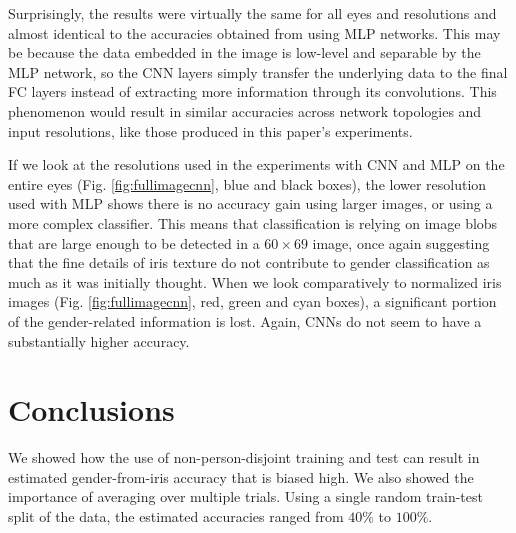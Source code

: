\documentclass[10pt,twocolumn,letterpaper]{article}
\begin{document}
Surprisingly, the results were virtually the same for all eyes and resolutions and almost identical to the accuracies obtained from using MLP networks. 
This may be because the data embedded in the image is low-level and separable by the MLP network, so the CNN layers simply transfer the underlying data to the final FC layers instead of extracting more information through its convolutions. 
This phenomenon would result in similar accuracies across network topologies and input resolutions, like those produced in this paper's experiments.

If we look at the resolutions used in the experiments with CNN and MLP on the entire eyes (Fig. \ref{fig:fullimagecnn}, blue and black boxes), the lower resolution used with MLP shows there is no accuracy gain using larger images, or using a more complex classifier.
This means that classification is relying on image blobs that are large enough to be detected in a $60 \times 69$ image, once again suggesting that the fine details of iris texture do not contribute to gender classification as much as it was initially thought.
When we look comparatively to normalized iris images (Fig. \ref{fig:fullimagecnn}, red, green and cyan boxes), a significant portion of the gender-related information is lost.
Again, CNNs do not seem to have a substantially higher accuracy.



\section{Conclusions}

We showed how the use of non-person-disjoint training and test can result in estimated gender-from-iris accuracy that is biased high.
We also showed the importance of averaging over multiple trials.
Using a single random train-test split of the data, the estimated accuracies ranged from $40\%$ to $100\%$.
\end{document}
